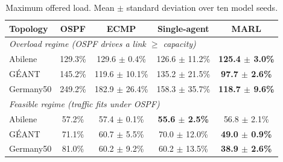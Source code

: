 \begin{table}[htbp]
  \centering
  \small
  \caption{Maximum offered load. Mean $\pm$ standard deviation over ten model seeds.}
  \label{tab:offered-util}
  \setlength{\tabcolsep}{4.5pt}
  \begin{tabular}{lcccc}
    \toprule
    Topology & OSPF & ECMP & Single-agent & MARL  \\
    \midrule
    \multicolumn{5}{l}{\emph{Overload regime (OSPF drives a link $\geq$ capacity)}} \\
    \midrule
    Abilene   & 129.3\% & 129.6 $\pm$ 0.4\% & 126.6 $\pm$ 11.2\% & \textbf{125.4 $\pm$ 3.0\%}          \\
    GÉANT     & 145.2\% & 119.6 $\pm$ 10.1\% & 135.2 $\pm$ 21.5\%         & \textbf{97.7 $\pm$ 2.6\%}  \\
    Germany50 & 249.2\% & 182.9 $\pm$ 26.4\% & 158.3 $\pm$ 35.7\%         & \textbf{118.7 $\pm$ 9.6\%}         \\
    \midrule
    \multicolumn{5}{l}{\emph{Feasible regime (traffic fits under OSPF)}} \\
    \midrule
    Abilene   & 57.2\% & 57.4 $\pm$ 0.1\% & \textbf{55.6 $\pm$ 2.5\%} & 56.8 $\pm$ 2.1\%           \\
    GÉANT     & 71.1\% & 60.7 $\pm$ 5.5\% & 70.0 $\pm$ 12.0\%          & \textbf{49.0 $\pm$ 0.9\%}  \\
    Germany50 & 81.0\% & 60.2 $\pm$ 9.2\% & 60.2 $\pm$ 13.5\%         & \textbf{38.9 $\pm$ 2.6\%}         \\
    \bottomrule
  \end{tabular}
\end{table}

